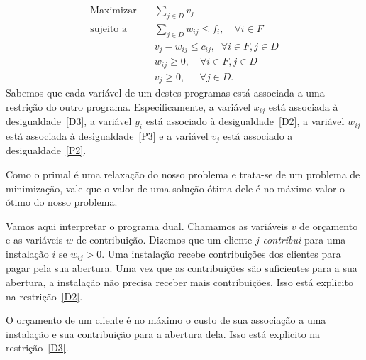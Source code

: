 \documentclass[12pt]{article}
\begin{document}
    \begin{align}
        \text{Maximizar} \quad & \sum_{j \in D} v_{j} \tag{D1} \label{D1}\\
        \text{sujeito a} \quad & \sum_{j\in D} w_{ij}\leq f_i, \quad \forall i \in F \tag{D2} \label{D2}\\
        &v_{j} - w_{ij}\leq c_{ij},  \; \; \forall i\in F,j\in D \tag{D3} \label{D3}\\
        &w_{ij} \geq 0 ,\quad \forall i\in F,j\in D\tag{D4} \label{D4}\\
        &v_j \geq 0, \quad \; \,\forall j\in D \tag{D5} \label{D5}.
       \end{align}
Sabemos que cada variável de um destes programas está associada a uma restrição do outro programa. 
Especificamente, a variável $x_{ij}$ está associada à desigualdade~\eqref{D3}, a variável $y_i$ está associado à desigualdade~\eqref{D2}, a variável $w_{ij}$ está associada à desigualdade~\eqref{P3} e a variável $v_j$ está associado a desigualdade~\eqref{P2}.

Como o primal é uma relaxação do nosso problema e trata-se de um problema de minimização, vale que o valor de uma solução ótima dele é no máximo valor o ótimo do nosso problema.

Vamos aqui interpretar o programa dual. Chamamos as variáveis $v$ de orçamento e as variáveis $w$ de contribuição. Dizemos que um cliente $j$ \emph{contribui} para uma instalação $i$ se $w_{ij} > 0$. Uma instalação recebe contribuições dos clientes para pagar pela sua abertura. Uma vez que as contribuições são suficientes para a sua abertura, a instalação não precisa receber mais contribuições. Isso está explicito na restrição~\eqref{D2}.

O orçamento de um cliente é no máximo o custo de sua associação a uma instalação e sua contribuição para a abertura dela. Isso está explicito na restrição~\eqref{D3}.
\end{document}
